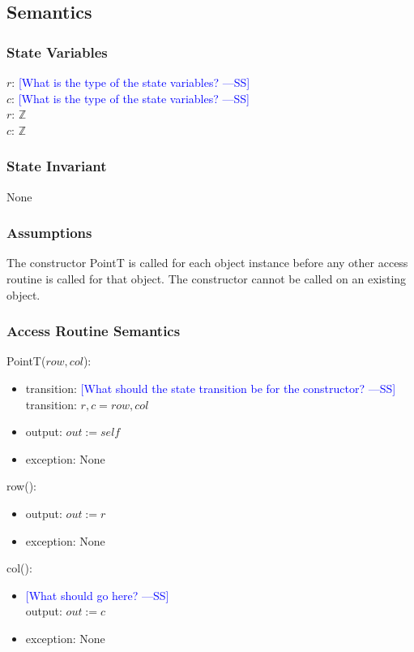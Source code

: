 \documentclass[12pt]{article}
\newcommand{\authornote}[3]{\textcolor{#1}{[#3 ---#2]}}
\newcommand{\authornote}[3]{}
\newcommand{\wss}[1]{\authornote{blue}{SS}{#1}}
\begin{document}
\subsection* {Semantics}

\subsubsection* {State Variables}

$r$: \wss{What is the type of the state variables?}\\
$c$: \wss{What is the type of the state variables?}\\
$r$: $\mathbb{Z}$\\
$c$: $\mathbb{Z}$

\subsubsection* {State Invariant}

None

\subsubsection* {Assumptions}

The constructor PointT is called for each object instance before any other
access routine is called for that object.  The constructor cannot be called on
an existing object.

\subsubsection* {Access Routine Semantics}

PointT($row, col$):
\begin{itemize}
\item transition: \wss{What should the state transition be for the constructor?}\\
transition: $r, c = row, col$
\item output: $out := \mathit{self}$
\item exception: None
\end{itemize}

\noindent row():
\begin{itemize}
\item output: $out := r$
\item exception: None
\end{itemize}

\noindent col():
\begin{itemize}
\item \wss{What should go here?}\\
output:  $out := c$
\item exception: None
\end{itemize}
\end{document}
